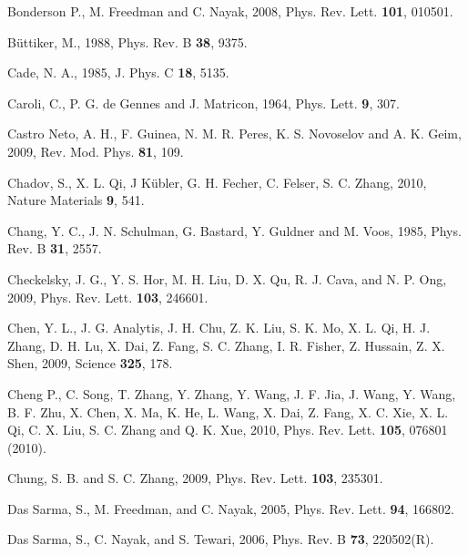 \documentclass[twocolumn,floatfix,showpacs,rmp,aps]{revtex4}
\begin{document}
\begin{thebibliography}{99}
		Bonderson P., M. Freedman and C. Nayak, 2008,
		Phys. Rev. Lett. {\bf 101}, 010501.
		
		B\"uttiker, M., 1988,
		Phys. Rev. B {\bf 38}, 9375.
		
		Cade, N. A., 1985,
		J. Phys. C {\bf 18}, 5135.
		
		Caroli, C., P. G. de Gennes and J. Matricon, 1964,
		Phys. Lett. {\bf 9}, 307.
		
		Castro Neto, A. H., F. Guinea, N. M. R. Peres, K. S. Novoselov and A. K. Geim, 2009,
		Rev. Mod. Phys. {\bf 81}, 109.
		
		Chadov, S., X. L. Qi, J K\"ubler, G. H. Fecher, C. Felser, S. C. Zhang, 2010,
		Nature Materials {\bf 9}, 541.
		
		Chang, Y. C., J. N. Schulman, G. Bastard, Y. Guldner and M. Voos, 1985,
		Phys. Rev. B {\bf 31}, 2557.
		
		
		Checkelsky, J. G., Y. S. Hor, M. H. Liu, D. X. Qu, R. J. Cava, and N. P. Ong, 2009,
		Phys. Rev. Lett. {\bf 103}, 246601.
		
		Chen, Y. L., J. G. Analytis, J. H. Chu, Z. K. Liu, S. K. Mo, X. L. Qi, H. J. Zhang,
		D. H. Lu, X. Dai, Z. Fang, S. C. Zhang, I. R. Fisher, Z. Hussain, Z. X. Shen, 2009,
		Science {\bf 325}, 178.
		
		Cheng P., C. Song, T. Zhang, Y. Zhang, Y. Wang, J. F. Jia, J. Wang, Y. Wang, B. F. Zhu,
		X. Chen, X. Ma, K. He, L. Wang, X. Dai, Z. Fang, X. C. Xie, X. L. Qi, C. X. Liu,
		S. C. Zhang and Q. K. Xue, 2010,
		Phys. Rev. Lett. {\bf 105}, 076801 (2010).
		
		Chung, S. B. and S. C. Zhang, 2009,
		Phys. Rev. Lett. {\bf 103}, 235301.
		
		Das Sarma, S., M. Freedman, and C. Nayak, 2005,
		Phys. Rev. Lett. {\bf 94}, 166802.
		
		Das Sarma, S., C. Nayak, and S. Tewari, 2006,
		Phys. Rev. B {\bf 73}, 220502(R).
		

\end{thebibliography}
\end{document}

